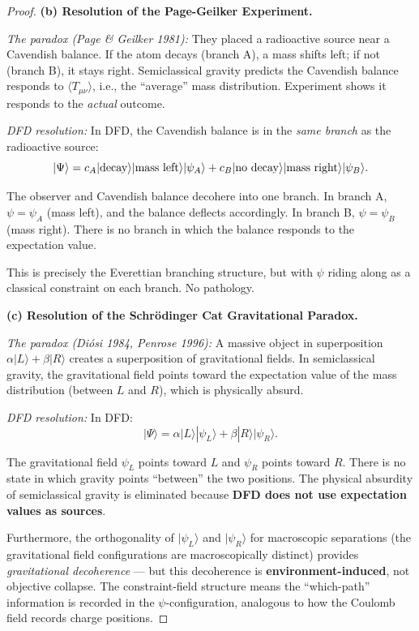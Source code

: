 \documentclass[11pt,a4paper]{article}
\begin{document}
\begin{proof}
\textbf{(b) Resolution of the Page-Geilker Experiment.}

\emph{The paradox (Page \& Geilker 1981):} They placed a radioactive source near a Cavendish balance. If the atom decays (branch A), a mass shifts left; if not (branch B), it stays right. Semiclassical gravity predicts the Cavendish balance responds to $\langle T_{\mu\nu}\rangle$, i.e., the ``average'' mass distribution. Experiment shows it responds to the \emph{actual} outcome.

\emph{DFD resolution:} In DFD, the Cavendish balance is in the \emph{same branch} as the radioactive source:
\begin{equation}
|\Psi\rangle = c_A|{\rm decay}\rangle|{\rm mass\ left}\rangle|\psi_A\rangle + c_B|{\rm no\ decay}\rangle|{\rm mass\ right}\rangle|\psi_B\rangle.
\end{equation}

The observer and Cavendish balance decohere into one branch. In branch A, $\psi = \psi_A$ (mass left), and the balance deflects accordingly. In branch B, $\psi = \psi_B$ (mass right). There is no branch in which the balance responds to the expectation value.

This is precisely the Everettian branching structure, but with $\psi$ riding along as a classical constraint on each branch. No pathology.

\textbf{(c) Resolution of the Schr\"odinger Cat Gravitational Paradox.}

\emph{The paradox (Di\'osi 1984, Penrose 1996):} A massive object in superposition $\alpha|L\rangle + \beta|R\rangle$ creates a superposition of gravitational fields. In semiclassical gravity, the gravitational field points toward the expectation value of the mass distribution (between $L$ and $R$), which is physically absurd.

\emph{DFD resolution:} In DFD:
\begin{equation}
|\Psi\rangle = \alpha|L\rangle|\psi_L\rangle + \beta|R\rangle|\psi_R\rangle.
\end{equation}

The gravitational field $\psi_L$ points toward $L$ and $\psi_R$ points toward $R$. There is no state in which gravity points ``between'' the two positions. The physical absurdity of semiclassical gravity is eliminated because \textbf{DFD does not use expectation values as sources}.

Furthermore, the orthogonality of $|\psi_L\rangle$ and $|\psi_R\rangle$ for macroscopic separations (the gravitational field configurations are macroscopically distinct) provides \emph{gravitational decoherence} --- but this decoherence is \textbf{environment-induced}, not objective collapse. The constraint-field structure means the ``which-path'' information is recorded in the $\psi$-configuration, analogous to how the Coulomb field records charge positions.


\end{proof}
\end{document}
